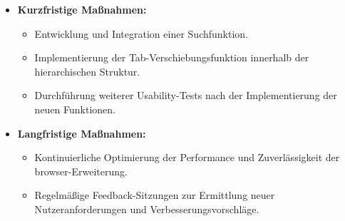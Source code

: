 \begin{itemize}
    \item \textbf{Kurzfristige Maßnahmen:}
    \begin{itemize}
        \item Entwicklung und Integration einer Suchfunktion.
        \item Implementierung der Tab-Verschiebungsfunktion innerhalb der hierarchischen Struktur.
        \item Durchführung weiterer Usability-Tests nach der Implementierung der neuen Funktionen.
    \end{itemize}
    \item \textbf{Langfristige Maßnahmen:}
    \begin{itemize}
        \item Kontinuierliche Optimierung der Performance und Zuverlässigkeit der \gls{browser}-Erweiterung.
        \item Regelmäßige Feedback-Sitzungen zur Ermittlung neuer Nutzeranforderungen und Verbesserungsvorschläge.
    \end{itemize}
\end{itemize}
